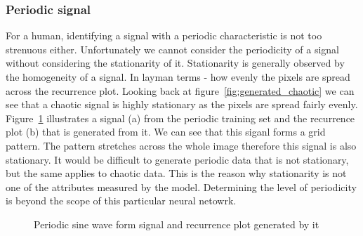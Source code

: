 \documentclass[a4paper,12pt,fleqn]{article}
\begin{document}
\subsubsection{Periodic signal}
For a human, identifying a signal with a periodic characteristic is not too strenuous either.
Unfortunately we cannot consider the periodicity of a signal without considering the stationarity of it.
Stationarity is generally observed by the homogeneity of a signal.
In layman terms - how evenly the pixels are spread across the recurrence plot.
Looking back at figure~\ref{fig:generated_chaotic} we can see that a chaotic signal is highly stationary as the pixels are spread fairly evenly.
Figure~\ref{fig:generated_periodic_sin} illustrates a signal (a) from the periodic training set and the recurrence plot (b) that is generated from it.
We can see that this siganl forms a grid pattern.
The pattern stretches across the whole image therefore this signal is also stationary.
It would be difficult to generate periodic data that is not stationary, but the same applies to chaotic data.
This is the reason why stationarity is not one of the attributes measured by the model.
Determining the level of periodicity is beyond the scope of this particular neural netowrk.
\begin{figure}
  \centering
  \qquad
  \caption{Periodic sine wave form signal and recurrence plot generated by it}
  \label{fig:generated_periodic_sin}
\end{figure}
\end{document}
